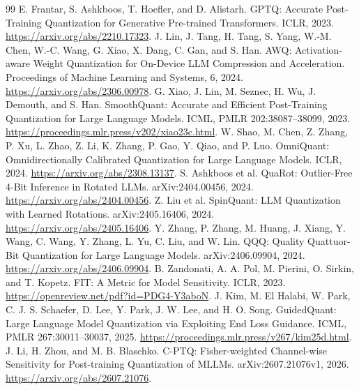 \documentclass[10pt,twocolumn]{article}
\begin{document}
\begin{thebibliography}{99}
\small
{}
E. Frantar, S. Ashkboos, T. Hoefler, and D. Alistarh.
\newblock GPTQ: Accurate Post-Training Quantization for Generative Pre-trained Transformers.
\newblock ICLR, 2023. \url{https://arxiv.org/abs/2210.17323}.
J. Lin, J. Tang, H. Tang, S. Yang, W.-M. Chen, W.-C. Wang,
G. Xiao, X. Dang, C. Gan, and S. Han.
\newblock AWQ: Activation-aware Weight Quantization for On-Device LLM Compression and Acceleration.
\newblock Proceedings of Machine Learning and Systems, 6, 2024.
\newblock \url{https://arxiv.org/abs/2306.00978}.
G. Xiao, J. Lin, M. Seznec, H. Wu, J. Demouth, and S. Han.
\newblock SmoothQuant: Accurate and Efficient Post-Training Quantization for Large Language Models.
\newblock ICML, PMLR 202:38087--38099, 2023.
\newblock \url{https://proceedings.mlr.press/v202/xiao23c.html}.
W. Shao, M. Chen, Z. Zhang, P. Xu, L. Zhao, Z. Li, K. Zhang,
P. Gao, Y. Qiao, and P. Luo.
\newblock OmniQuant: Omnidirectionally Calibrated Quantization for Large Language Models.
\newblock ICLR, 2024. \url{https://arxiv.org/abs/2308.13137}.
S. Ashkboos et al.
\newblock QuaRot: Outlier-Free 4-Bit Inference in Rotated LLMs.
\newblock arXiv:2404.00456, 2024. \url{https://arxiv.org/abs/2404.00456}.
Z. Liu et al.
\newblock SpinQuant: LLM Quantization with Learned Rotations.
\newblock arXiv:2405.16406, 2024. \url{https://arxiv.org/abs/2405.16406}.
Y. Zhang, P. Zhang, M. Huang, J. Xiang, Y. Wang, C. Wang,
Y. Zhang, L. Yu, C. Liu, and W. Lin.
\newblock QQQ: Quality Quattuor-Bit Quantization for Large Language Models.
\newblock arXiv:2406.09904, 2024. \url{https://arxiv.org/abs/2406.09904}.
B. Zandonati, A. A. Pol, M. Pierini, O. Sirkin, and T. Kopetz.
\newblock FIT: A Metric for Model Sensitivity.
\newblock ICLR, 2023. \url{https://openreview.net/pdf?id=PDG4-Y3aboN}.
J. Kim, M. El Halabi, W. Park, C. J. S. Schaefer, D. Lee,
Y. Park, J. W. Lee, and H. O. Song.
\newblock GuidedQuant: Large Language Model Quantization via Exploiting End Loss Guidance.
\newblock ICML, PMLR 267:30011--30037, 2025.
\newblock \url{https://proceedings.mlr.press/v267/kim25d.html}.
J. Li, H. Zhou, and M. B. Blaschko.
\newblock C-PTQ: Fisher-weighted Channel-wise Sensitivity for Post-training Quantization of MLLMs.
\newblock arXiv:2607.21076v1, 2026. \url{https://arxiv.org/abs/2607.21076}.

\end{thebibliography}
\end{document}
